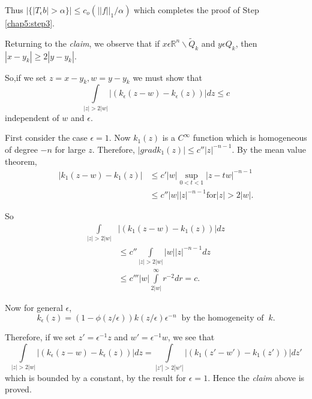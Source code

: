Thus $|\{ | T_{\epsilon} b | > \alpha\}| \leq c_o (|| f ||_1 /
\alpha )$ which completes the proof of Step \ref{chap5:step3}. 

Returning to the \textit{claim},  we observe that if $x \epsilon
\mathbb{R}^n \backslash \tilde{Q}_k$ and $y \epsilon Q_k$, then
$|x-y_k| \geq 2 |y - y_k|$. 

So,\pageoriginale if we set $z = x-y _k,  w = y -y_k$ we must show that
$$
\int\limits_{|z| >2 |w|} |(k _{\epsilon} (z-w)- k_{\epsilon}
(z)) | dz \leq c 
$$
independent of $w$ and $\epsilon$.	 

\begin{figure}[H]
\end{figure}

First consider the case $\epsilon =1$. Now $k_1 (z)$ is a
$C^{\infty}$ function which is homogeneous of degree $-n$ for large
$z$. Therefore,  $| grad k_1 (z) | \leq c'' |z| ^{-n-1}$. By the mean
value theorem, 
\begin{align*}
  |k_1  (z-w) - k_1 (z) | & \leq c' |w| \sup_{0< t< 1} |z - tw|^{-n-1}\\
  & \leq c'' |w|| z| ^{-n-1} \text{for} |z| > 2 |w|.
\end{align*}

So
\begin{align*}
  \int\limits_{|z| > 2 |w|} & |(k_1 (z-w) - k_1 (z))| dz\\
  & \leq c''  \int\limits_{|z| > 2 |w|} |w| |z| ^{-n-1} dz\\
  & \leq c''' |w| \int\limits_{2|w|}^{\infty} r^{-2} dr =c.
\end{align*}

Now for general $\epsilon$,
$$
k_{\epsilon} (z) = (1 - \phi (z/\epsilon)) k (z / \epsilon)
\epsilon^{-n}~\text{ by the homogeneity of  }~ k. 
$$

Therefore, if we set $z' = \epsilon^{-1} z$ and $w' =
\epsilon^{-1} w$, we see that 
$$
 \int\limits_{|z| > 2 |w|} |(k _{\epsilon}(z-w) - k
 _{\epsilon}(z))| dz =\int\limits_{|z'| > 2 |w'|} |(k_1 (z' -
 w')-k_1 (z'))| dz' 
 $$
 which is bounded by a constant,  by the result for $\epsilon =1$.
 Hence the \textit{claim} above is proved. 
 
